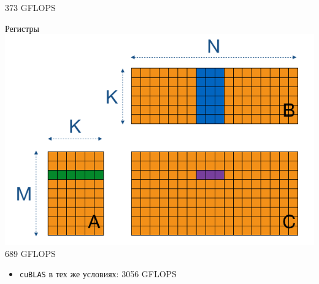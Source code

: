 \documentclass[xcolor=table,aspectratio=169]{beamer}
\begin{document}
\begin{frame}[fragile]
\begin{minipage}[t][0.5\textheight]{0.32\textwidth}
\begin{center}
    \vfill
    373 GFLOPS
  \end{center}
  \end{minipage}
  \begin{minipage}[t][0.5\textheight]{0.32\textwidth}
    \begin{center}
      \vspace{-1cm}
      Регистры
    \includegraphics[valign=t,width=\textwidth]{pictures/gemm3.png}
    \vfill
    689 GFLOPS
  \end{center}
  \end{minipage}
  \vfill
  \begin{itemize}
    \item[\faSmileO] \texttt{cuBLAS} в тех же условиях: 3056 GFLOPS
  \end{itemize}
\end{frame}
\end{document}
